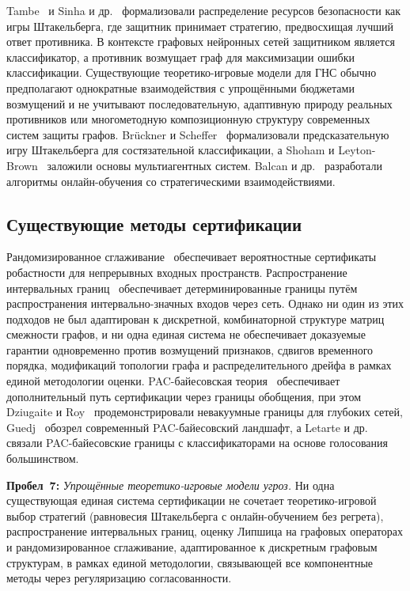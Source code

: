 Tambe~\cite{Tambe2011} и Sinha и др.~\cite{Sinha2018} формализовали распределение ресурсов безопасности как игры Штакельберга, где защитник принимает стратегию, предвосхищая лучший ответ противника. В контексте графовых нейронных сетей защитником является классификатор, а противник возмущает граф для максимизации ошибки классификации. Существующие теоретико-игровые модели для ГНС обычно предполагают однократные взаимодействия с упрощёнными бюджетами возмущений и не учитывают последовательную, адаптивную природу реальных противников или многометодную композиционную структуру современных систем защиты графов. Br\"{u}ckner и Scheffer~\cite{Bruckner2011} формализовали предсказательную игру Штакельберга для состязательной классификации, а Shoham и Leyton-Brown~\cite{Shoham2009} заложили основы мультиагентных систем. Balcan и др.~\cite{Balcan2015} разработали алгоритмы онлайн-обучения со стратегическими взаимодействиями.


\subsection{Существующие методы сертификации}

Рандомизированное сглаживание~\cite{Cohen2019,Salman2019} обеспечивает вероятностные сертификаты робастности для непрерывных входных пространств. Распространение интервальных границ~\cite{Gowal2019,Wong2018} обеспечивает детерминированные границы путём распространения интервально-значных входов через сеть. Однако ни один из этих подходов не был адаптирован к дискретной, комбинаторной структуре матриц смежности графов, и ни одна единая система не обеспечивает доказуемые гарантии одновременно против возмущений признаков, сдвигов временного порядка, модификаций топологии графа и распределительного дрейфа в рамках единой методологии оценки. PAC-байесовская теория~\cite{McAllester1999,Catoni2007} обеспечивает дополнительный путь сертификации через границы обобщения, при этом Dziugaite и Roy~\cite{Dziugaite2017} продемонстрировали невакуумные границы для глубоких сетей, Guedj~\cite{Guedj2019} обозрел современный PAC-байесовский ландшафт, а Letarte и др.~\cite{Letarte2019} связали PAC-байесовские границы с классификаторами на основе голосования большинством.

\medskip
\noindent\textbf{Пробел~7:} \emph{Упрощённые теоретико-игровые модели угроз.} Ни одна существующая единая система сертификации не сочетает теоретико-игровой выбор стратегий (равновесия Штакельберга с онлайн-обучением без регрета), распространение интервальных границ, оценку Липшица на графовых операторах и рандомизированное сглаживание, адаптированное к дискретным графовым структурам, в рамках единой методологии, связывающей все компонентные методы через регуляризацию согласованности.

